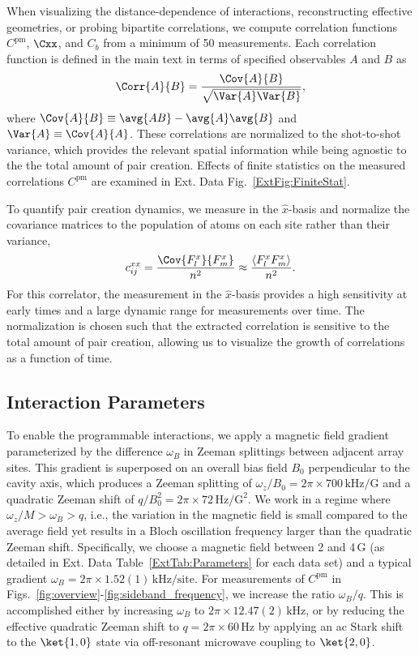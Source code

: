 \documentclass[aps,pra,superscriptaddress,12pt]{revtex4-1} %
\begin{document}
\begin{bibunit}
When visualizing the distance-dependence of interactions, reconstructing effective geometries, or probing bipartite correlations, we compute correlation functions $C^\mathrm{pm}$,  $\Cxx$, and $C_b$ from a minimum of 50 measurements.  Each correlation function is defined in the main text in terms of specified observables $A$ and $B$ as
\begin{equation}
    \Corr{A}{B} = \frac{\Cov{A}{B}}{\sqrt{\Var{A}\Var{B}}},
\end{equation}
where $\Cov{A}{B} \equiv \avg{AB}-\avg{A}\avg{B}$ and $\Var{A} \equiv \Cov{A}{A}$.  These correlations are normalized to the shot-to-shot variance, which provides the relevant spatial information while being agnostic to the the total amount of pair creation. Effects of finite statistics on the measured correlations $C^\mathrm{pm}$ are examined in Ext. Data Fig.~\ref{ExtFig:FiniteStat}.

To quantify pair creation dynamics, we measure in the $\hat{x}$-basis and normalize the covariance matrices to the population of atoms on each site rather than their variance,
\begin{equation}
    c^{xx}_{ij} = \frac{\Cov{F_l^x}{F_m^x}}{n^2} \approx \frac{\langle F_l^x F_m^x \rangle}{n^2}.
\end{equation}
For this correlator, the measurement in the $\hat{x}$-basis provides a high sensitivity at early times and a large dynamic range for measurements over time.
The normalization is chosen such that  the extracted correlation is sensitive to the total amount of pair creation, allowing us to visualize the growth of correlations as a function of time.

\subsection{Interaction Parameters}
To enable the programmable interactions, we apply a magnetic field gradient parameterized by the difference $\omega_B$ in Zeeman splittings between adjacent array sites.  This gradient is superposed on an overall bias field $B_0$ perpendicular to the cavity axis, which produces a Zeeman splitting of $\omega_z/B_0 = 2\pi\times700\,\text{kHz}/\text{G}$ and a quadratic Zeeman shift of $q/B_0^2 = 2\pi\times 72\,\text{Hz}/\text{G}^2$. We work in a regime where $\omega_z/M > \omega_B > q$, i.e., the variation in the magnetic field is small compared to the average field yet results in a Bloch oscillation frequency larger than the quadratic Zeeman shift. Specifically, we choose a magnetic field between 2 and 4\,G (as detailed in Ext. Data Table~\ref{ExtTab:Parameters} for each data set) and a typical gradient $\omega_B = 2\pi\times 1.52(1)\,\text{kHz/site}$. For measurements of $C^{\text{pm}}$ in Figs.~\ref{fig:overview}-\ref{fig:sideband_frequency}, we increase the ratio $\omega_B/q$.  This is accomplished either by increasing $\omega_B$ to $2\pi\times 12.47(2)\,\text{kHz}$, or by reducing the effective quadratic Zeeman shift to $q = 2\pi\times 60\,\text{Hz}$ by applying an ac Stark shift to the $\ket{1,0}$ state via off-resonant microwave coupling to $\ket{2,0}$.


\end{bibunit}
\end{document}
